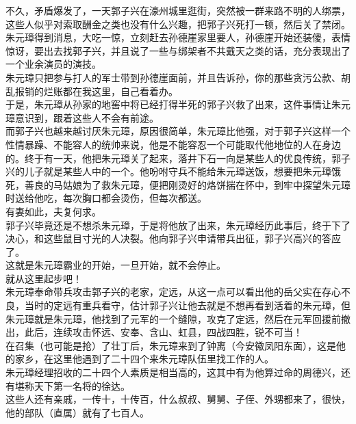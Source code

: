 \begin{multicols}{\theparacolNo}
不久，矛盾爆发了，一天郭子兴在濠州城里逛街，突然被一群来路不明的人绑票，这些人似乎对索取酬金之类也没有什么兴趣，把郭子兴死打一顿，然后关了禁闭。朱元璋得到消息，大吃一惊，立刻赶去孙德崖家里要人，孙德崖开始还装傻，表情惊讶，要出去找郭子兴，并且说了一些与绑架者不共戴天之类的话，充分表现出了一个业余演员的演技。\\

朱元璋只把参与打人的军士带到孙德崖面前，并且告诉孙，你的那些贪污公款、胡乱报销的烂账都在我这里，自己看着办。\\

于是，朱元璋从孙家的地窖中将已经打得半死的郭子兴救了出来，这件事情让朱元璋意识到，跟着这些人不会有前途。\\

而郭子兴也越来越讨厌朱元璋，原因很简单，朱元璋比他强，对于郭子兴这样一个性情暴躁、不能容人的统帅来说，他是不能容忍一个可能取代他地位的人在身边的。终于有一天，他把朱元璋关了起来，落井下石一向是某些人的优良传统，郭子兴的儿子就是某些人中的一个。他吩咐守兵不能给朱元璋送饭，想要把朱元璋饿死，善良的马姑娘为了救朱元璋，便把刚烫好的烙饼揣在怀中，到牢中探望朱元璋时送给他吃，每次胸口都会烫伤，但每次都送。\\

有妻如此，夫复何求。\\

郭子兴毕竟还是不想杀朱元璋，于是将他放了出来，朱元璋经历此事后，终于下了决心，和这些鼠目寸光的人决裂。他向郭子兴申请带兵出征，郭子兴高兴的答应了。\\

这就是朱元璋霸业的开始，一旦开始，就不会停止。\\

就从这里起步吧！\\

朱元璋奉命带兵攻击郭子兴的老家，定远，从这一点可以看出他的岳父实在存心不良，当时的定远有重兵看守，估计郭子兴让他去就是不想再看到活着的朱元璋，但朱元璋就是朱元璋，他找到了元军的一个缝隙，攻克了定远，然后在元军回援前撤出，此后，连续攻击怀远、安奉、含山、虹县，四战四胜，锐不可当！\\

在召集（也可能是抢）了壮丁后，朱元璋来到了钟离（今安徽凤阳东面），这是他的家乡，在这里他遇到了二十四个来朱元璋队伍里找工作的人。\\

朱元璋经理招收的二十四个人素质是相当高的，这其中有为他算过命的周德兴，还有堪称天下第一名将的徐达。\\

这些人还有亲戚，一传十，十传百，什么叔叔、舅舅、子侄、外甥都来了，很快，他的部队（直属）就有了七百人。\\


\end{multicols}
